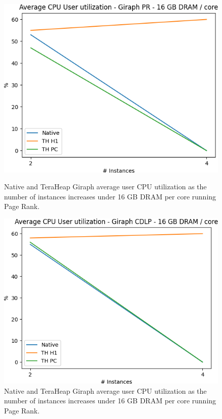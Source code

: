 \begin{figure}[thbp]
	\centering
        \includegraphics[width=\linewidth]{./fig/G_PR_128_USR.png}
    \caption{Native and TeraHeap Giraph average user CPU utilization
        as the number of instances increases under 16 GB DRAM per core running Page Rank.}
        \label{fig:g_pr128_usr}
        \includegraphics[width=\linewidth]{./fig/G_CDLP_128_USR.png}
    \caption{Native and TeraHeap Giraph average user CPU utilization
        as the number of instances increases under 16 GB DRAM per core running Page Rank.}
        \label{fig:g_cdlp128_usr}
\end{figure}
\iffalse
